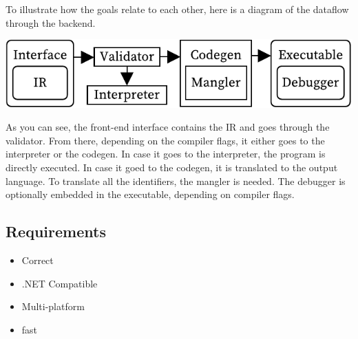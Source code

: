 To illustrate how the goals relate to each other, here is a diagram of the dataflow through the backend.

\includegraphics[width=\columnwidth]{overview}

As you can see, the front-end interface contains the IR and goes through the validator.
From there, depending on the compiler flags, it either goes to the interpreter or the codegen.
In case it goes to the interpreter, the program is directly executed.
In case it goed to the codegen, it is translated to the output language.
To translate all the identifiers, the mangler is needed.
The debugger is optionally embedded in the executable, depending on compiler flags.

\subsection{Requirements}
\begin{itemize}
    \item Correct
    \item .NET Compatible
    \item Multi-platform
    \item fast
\end{itemize}
